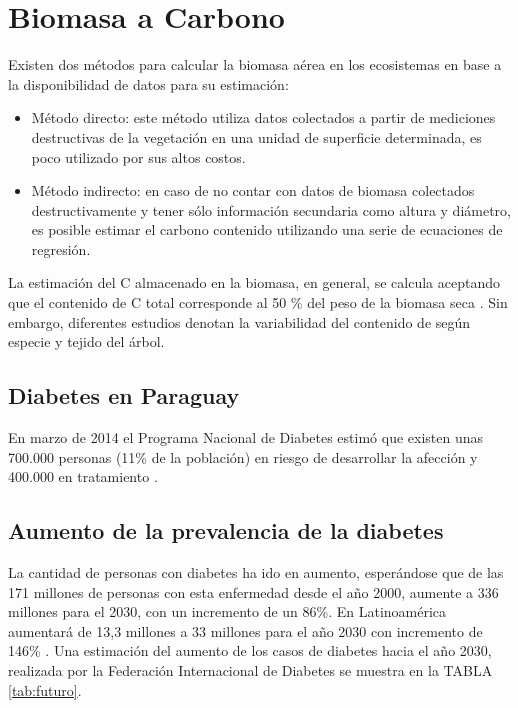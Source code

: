 \section{Biomasa a Carbono}
Existen dos m\'etodos para calcular la biomasa a\'erea en los ecosistemas en base a la disponibilidad de datos para su estimaci\'on\cite{pinaestimacion}: 
\begin{itemize}
	\item M\'etodo directo: este m\'etodo utiliza datos colectados a partir de mediciones destructivas de la vegetaci\'on en una unidad de superficie determinada, es poco utilizado por sus altos costos.
	
	\item M\'etodo indirecto: en caso de no contar con datos de biomasa colectados destructivamente y tener sólo información secundaria como altura y di\'ametro, es posible estimar el carbono contenido utilizando una serie de ecuaciones de regresi\'on.
\end{itemize}
La estimación del C almacenado en la biomasa, en general, se calcula aceptando que el contenido de C total corresponde al 50 \% del peso de la biomasa seca \cite{slijepcevic2001loss}. Sin embargo, diferentes estudios denotan la variabilidad del contenido de seg\'un especie y tejido del \'arbol\cite{francis2000estimating}.

\subsection{Diabetes en Paraguay}
En marzo de 2014 el Programa Nacional de Diabetes estimó que existen unas 700.000 personas (11\% de la población) en riesgo de desarrollar la afección y 400.000 en tratamiento \cite{20medios}. 
\subsection{Aumento de la prevalencia de la diabetes}
La cantidad de personas con diabetes ha ido en aumento, esperándose que de las 171 millones de personas con esta enfermedad desde el año 2000, aumente a 336 millones para el 2030, con un incremento de un 86\%. En Latinoamérica aumentará de 13,3 millones a 33 millones para el año 2030 con incremento de 146\% \cite{wild2004global}. Una estimación del aumento de los casos de diabetes hacia el año 2030, realizada por la Federación Internacional de Diabetes \cite{idf} se muestra en la TABLA \ref{tab:futuro}.


